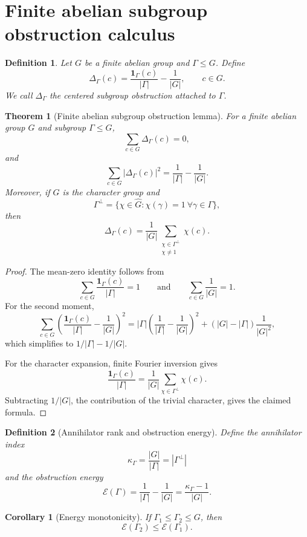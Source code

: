 \documentclass[11pt]{article}
\newtheorem{theorem}{Theorem}
\newtheorem{corollary}{Corollary}
\newtheorem{definition}{Definition}
\newcommand{\1}{\mathbf 1}
\begin{document}
\section{Finite abelian subgroup obstruction calculus}

\begin{definition}
Let \(G\) be a finite abelian group and \(\Gamma\le G\).  Define
\[
\Delta_\Gamma(c)=\frac{\1_\Gamma(c)}{|\Gamma|}-\frac1{|G|},\qquad c\in G.
\]
We call \(\Delta_\Gamma\) the centered subgroup obstruction attached to \(\Gamma\).
\end{definition}

\begin{theorem}[Finite abelian subgroup obstruction lemma]\label{T:finite}
For a finite abelian group \(G\) and subgroup \(\Gamma\le G\),
\[
\sum_{c\in G}\Delta_\Gamma(c)=0,
\]
and
\[
\sum_{c\in G}|\Delta_\Gamma(c)|^2=\frac1{|\Gamma|}-\frac1{|G|}.
\]
Moreover, if \(\widehat G\) is the character group and
\[
\Gamma^\perp=\{\chi\in\widehat G:\chi(\gamma)=1\ \forall \gamma\in\Gamma\},
\]
then
\[
\Delta_\Gamma(c)=
\frac1{|G|}
\sum_{\substack{\chi\in\Gamma^\perp\\ \chi\ne1}}\chi(c).
\]
\end{theorem}

\begin{proof}
The mean-zero identity follows from
\[
\sum_{c\in G}\frac{\1_\Gamma(c)}{|\Gamma|}=1
\qquad\text{and}\qquad
\sum_{c\in G}\frac1{|G|}=1.
\]
For the second moment,
\[
\sum_{c\in G}\left(\frac{\1_\Gamma(c)}{|\Gamma|}-\frac1{|G|}\right)^2
=
|\Gamma|\left(\frac1{|\Gamma|}-\frac1{|G|}\right)^2
+(|G|-|\Gamma|)\frac1{|G|^2},
\]
which simplifies to \(1/|\Gamma|-1/|G|\).

For the character expansion, finite Fourier inversion gives
\[
\frac{\1_\Gamma(c)}{|\Gamma|}
=
\frac1{|G|}\sum_{\chi\in\Gamma^\perp}\chi(c).
\]
Subtracting \(1/|G|\), the contribution of the trivial character, gives the claimed formula.
\end{proof}

\begin{definition}[Annihilator rank and obstruction energy]
Define the annihilator index
\[
\kappa_\Gamma=\frac{|G|}{|\Gamma|}=|\Gamma^\perp|
\]
and the obstruction energy
\[
\mathcal E(\Gamma)=\frac1{|\Gamma|}-\frac1{|G|}
=
\frac{\kappa_\Gamma-1}{|G|}.
\]
\end{definition}

\begin{corollary}[Energy monotonicity]
If \(\Gamma_1\le\Gamma_2\le G\), then
\[
\mathcal E(\Gamma_2)\le \mathcal E(\Gamma_1).
\]
\end{corollary}
\end{document}

